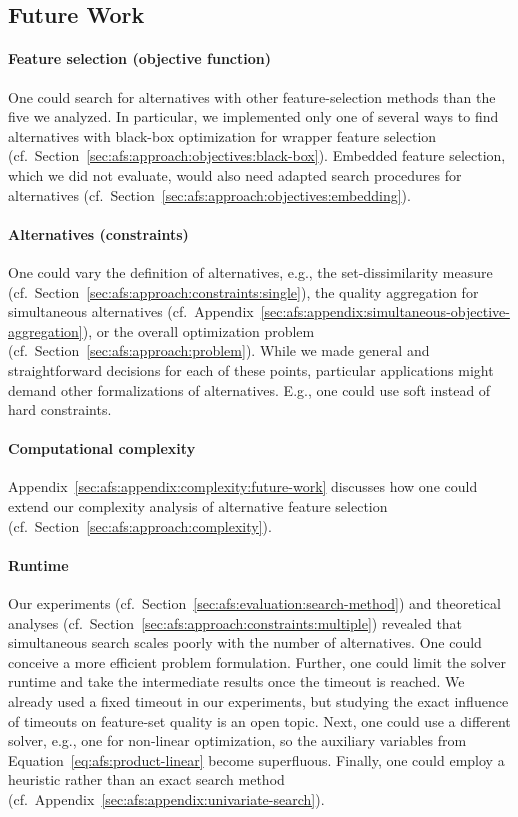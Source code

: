 \documentclass{article}
\theoremstyle{definition}
\begin{document}
\subsection{Future Work}
\label{sec:afs:conclusion:future-work}

\paragraph{Feature selection (objective function)}

One could search for alternatives with other feature-selection methods than the five we analyzed.
In particular, we implemented only one of several ways to find alternatives with black-box optimization for wrapper feature selection (cf.~Section~\ref{sec:afs:approach:objectives:black-box}).
Embedded feature selection, which we did not evaluate, would also need adapted search procedures for alternatives (cf.~Section~\ref{sec:afs:approach:objectives:embedding}).

\paragraph{Alternatives (constraints)}

One could vary the definition of alternatives, e.g., the set-dissimilarity measure (cf.~Section~\ref{sec:afs:approach:constraints:single}), the quality aggregation for simultaneous alternatives (cf.~Appendix~\ref{sec:afs:appendix:simultaneous-objective-aggregation}), or the overall optimization problem (cf.~Section~\ref{sec:afs:approach:problem}).
While we made general and straightforward decisions for each of these points, particular applications might demand other formalizations of alternatives.
E.g., one could use soft instead of hard constraints.

\paragraph{Computational complexity} Appendix~\ref{sec:afs:appendix:complexity:future-work} discusses how one could extend our complexity analysis of alternative feature selection (cf.~Section~\ref{sec:afs:approach:complexity}).

\paragraph{Runtime}

Our experiments (cf.~Section~\ref{sec:afs:evaluation:search-method}) and theoretical analyses (cf.~Section~\ref{sec:afs:approach:constraints:multiple}) revealed that simultaneous search scales poorly with the number of alternatives.
One could conceive a more efficient problem formulation.
Further, one could limit the solver runtime and take the intermediate results once the timeout is reached.
We already used a fixed timeout in our experiments, but studying the exact influence of timeouts on feature-set quality is an open topic.
Next, one could use a different solver, e.g., one for non-linear optimization, so the auxiliary variables from Equation~\ref{eq:afs:product-linear} become superfluous.
Finally, one could employ a heuristic rather than an exact search method (cf.~Appendix~\ref{sec:afs:appendix:univariate-search}).
\end{document}
